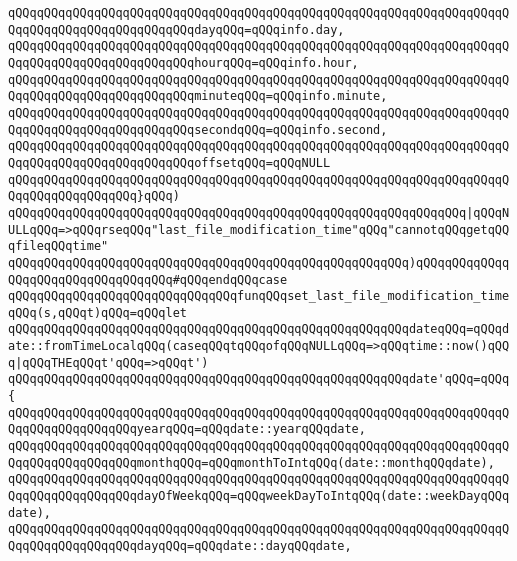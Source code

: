 \verb|qQQqqQQqqQQqqQQqqQQqqQQqqQQqqQQqqQQqqQQqqQQqqQQqqQQqqQQqqQQqqQQqqQQqqQQqqQQqqQQqqQQqqQQqqQQqqQQqdayqQQq=qQQqinfo.day,|\newline
\verb|qQQqqQQqqQQqqQQqqQQqqQQqqQQqqQQqqQQqqQQqqQQqqQQqqQQqqQQqqQQqqQQqqQQqqQQqqQQqqQQqqQQqqQQqqQQqqQQqhourqQQq=qQQqinfo.hour,|\newline
\verb|qQQqqQQqqQQqqQQqqQQqqQQqqQQqqQQqqQQqqQQqqQQqqQQqqQQqqQQqqQQqqQQqqQQqqQQqqQQqqQQqqQQqqQQqqQQqqQQqminuteqQQq=qQQqinfo.minute,|\newline
\verb|qQQqqQQqqQQqqQQqqQQqqQQqqQQqqQQqqQQqqQQqqQQqqQQqqQQqqQQqqQQqqQQqqQQqqQQqqQQqqQQqqQQqqQQqqQQqqQQqsecondqQQq=qQQqinfo.second,|\newline
\verb|qQQqqQQqqQQqqQQqqQQqqQQqqQQqqQQqqQQqqQQqqQQqqQQqqQQqqQQqqQQqqQQqqQQqqQQqqQQqqQQqqQQqqQQqqQQqqQQqoffsetqQQq=qQQqNULL|\newline
\verb|qQQqqQQqqQQqqQQqqQQqqQQqqQQqqQQqqQQqqQQqqQQqqQQqqQQqqQQqqQQqqQQqqQQqqQQqqQQqqQQqqQQqqQQq}qQQq)|\newline
\verb|qQQqqQQqqQQqqQQqqQQqqQQqqQQqqQQqqQQqqQQqqQQqqQQqqQQqqQQqqQQqqQQq|\verb#|qQQqNULLqQQq=>qQQqrseqQQq"last_file_modification_time"qQQq"cannotqQQqgetqQQqfileqQQqtime"#\newline
\verb|qQQqqQQqqQQqqQQqqQQqqQQqqQQqqQQqqQQqqQQqqQQqqQQqqQQqqQQq)qQQqqQQqqQQqqQQqqQQqqQQqqQQqqQQqqQQq#qQQqendqQQqcase|\newline
\newline
\verb|qQQqqQQqqQQqqQQqqQQqqQQqqQQqqQQqfunqQQqset_last_file_modification_timeqQQq(s,qQQqt)qQQq=qQQqlet|\newline
\verb|qQQqqQQqqQQqqQQqqQQqqQQqqQQqqQQqqQQqqQQqqQQqqQQqqQQqqQQqdateqQQq=qQQqdate::fromTimeLocalqQQq(caseqQQqtqQQqofqQQqNULLqQQq=>qQQqtime::now()qQQq|\verb#|qQQqTHEqQQqt'qQQq=>qQQqt')#\newline
\verb|qQQqqQQqqQQqqQQqqQQqqQQqqQQqqQQqqQQqqQQqqQQqqQQqqQQqqQQqdate'qQQq=qQQq{|\newline
\verb|qQQqqQQqqQQqqQQqqQQqqQQqqQQqqQQqqQQqqQQqqQQqqQQqqQQqqQQqqQQqqQQqqQQqqQQqqQQqqQQqqQQqqQQqyearqQQq=qQQqdate::yearqQQqdate,|\newline
\verb|qQQqqQQqqQQqqQQqqQQqqQQqqQQqqQQqqQQqqQQqqQQqqQQqqQQqqQQqqQQqqQQqqQQqqQQqqQQqqQQqqQQqqQQqmonthqQQq=qQQqmonthToIntqQQq(date::monthqQQqdate),|\newline
\verb|qQQqqQQqqQQqqQQqqQQqqQQqqQQqqQQqqQQqqQQqqQQqqQQqqQQqqQQqqQQqqQQqqQQqqQQqqQQqqQQqqQQqqQQqdayOfWeekqQQq=qQQqweekDayToIntqQQq(date::weekDayqQQqdate),|\newline
\verb|qQQqqQQqqQQqqQQqqQQqqQQqqQQqqQQqqQQqqQQqqQQqqQQqqQQqqQQqqQQqqQQqqQQqqQQqqQQqqQQqqQQqqQQqdayqQQq=qQQqdate::dayqQQqdate,|\newline
